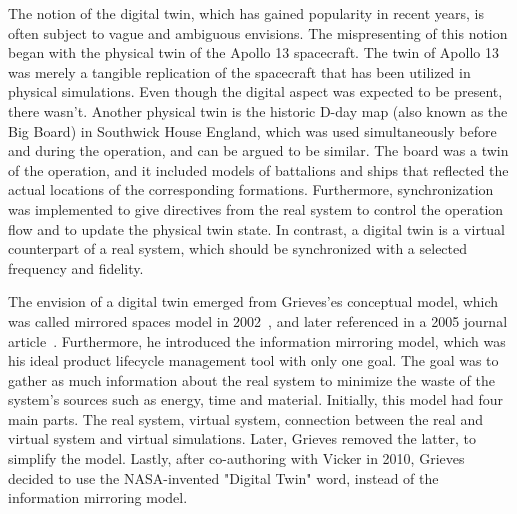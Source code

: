\documentclass{llncs}
\begin{document}
    The notion of the digital twin, which has gained popularity in 
    recent years, is often subject to vague and ambiguous envisions\cite{Review1}.
    The mispresenting of this notion began with the physical twin of the Apollo 13 spacecraft. 
    The twin of Apollo 13 was merely a tangible replication of the spacecraft that has been utilized in physical simulations. 
    Even though the digital aspect was expected to be present, there wasn't\cite{GrievesApollo13}.
    Another physical twin is the historic D-day map (also known as the Big Board) in Southwick House England, 
    which was used simultaneously before and during the operation, and can be argued to be similar. 
    The board was a twin of the operation, and it included models of battalions and ships that reflected the actual 
    locations of the corresponding formations. Furthermore, synchronization was 
    implemented to give directives from the real system to control the operation 
    flow and to update the physical twin state\cite{AMRC}.
    In contrast, a digital twin is a virtual counterpart of a real system, which should 
    be synchronized with a selected frequency and fidelity\cite{Review1,Review2,digitaltwinconsortium2022}.
    
    The envision of a digital twin emerged from Grieves'es conceptual model, which was called mirrored spaces model in 2002~\cite{Originsofdigitaltwinconcept},
    and later referenced in a 2005 journal article~\cite{2005JournayArticle}. 
    Furthermore, he introduced the information mirroring model, which was his ideal product lifecycle management tool with only one goal. 
    The goal was to gather as much information about the real system to minimize the waste of the system's sources such as energy, 
    time and material. Initially, this model had four main parts. The real system, 
    virtual system, connection between the real and virtual system and virtual simulations\cite{GrievesPLMBook}. 
    Later, Grieves removed the latter, to simplify the model\cite{Originsofdigitaltwinconcept}. Lastly, after co-authoring with Vicker in 2010, 
    Grieves decided to use the NASA-invented "Digital Twin" word, instead of the information mirroring model\cite{Originsofdigitaltwinconcept}.
     
\end{document}
